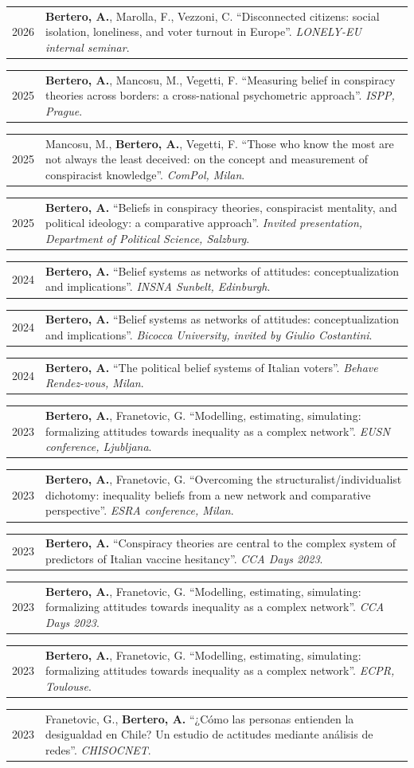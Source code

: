 \documentclass[10pt,a4paper]{article}
\makeatletter
\newlength{\yearw}\setlength{\yearw}{2.3cm}
\newlength{\bodyw}\setlength{\bodyw}{\dimexpr\textwidth-\yearw-0.45cm\relax}
\newcommand{\cv}[2]{%
  \needspace{2\baselineskip}%
  \par\noindent
  \begin{tabular}{@{}>{\raggedright\arraybackslash}p{\yearw}@{\hspace{0.45cm}}>{\raggedright\arraybackslash}p{\bodyw}@{}}
    \sanslabel\fontsize{8.5}{10.5}\selectfont\color{muted}#1 & #2
  \end{tabular}%
  \par\vspace{3pt}%
}
\newcommand{\venue}[1]{\textit{#1}}
\makeatother
\begin{document}
\cv{2026}{\textbf{Bertero, A.}, Marolla, F., Vezzoni, C. “Disconnected citizens: social isolation, loneliness, and voter turnout in Europe”. \venue{LONELY-EU internal seminar}.}

\cv{2025}{\textbf{Bertero, A.}, Mancosu, M., Vegetti, F. “Measuring belief in conspiracy theories across borders: a cross-national psychometric approach”. \venue{ISPP, Prague}.}

\cv{2025}{Mancosu, M., \textbf{Bertero, A.}, Vegetti, F. “Those who know the most are not always the least deceived: on the concept and measurement of conspiracist knowledge”. \venue{ComPol, Milan}.}

\cv{2025}{\textbf{Bertero, A.} “Beliefs in conspiracy theories, conspiracist mentality, and political ideology: a comparative approach”. \venue{Invited presentation, Department of Political Science, Salzburg}.}

\cv{2024}{\textbf{Bertero, A.} “Belief systems as networks of attitudes: conceptualization and implications”. \venue{INSNA Sunbelt, Edinburgh}.}

\cv{2024}{\textbf{Bertero, A.} “Belief systems as networks of attitudes: conceptualization and implications”. \venue{Bicocca University, invited by Giulio Costantini}.}

\cv{2024}{\textbf{Bertero, A.} “The political belief systems of Italian voters”. \venue{Behave Rendez-vous, Milan}.}

\cv{2023}{\textbf{Bertero, A.}, Franetovic, G. “Modelling, estimating, simulating: formalizing attitudes towards inequality as a complex network”. \venue{EUSN conference, Ljubljana}.}

\cv{2023}{\textbf{Bertero, A.}, Franetovic, G. “Overcoming the structuralist/individualist dichotomy: inequality beliefs from a new network and comparative perspective”. \venue{ESRA conference, Milan}.}

\cv{2023}{\textbf{Bertero, A.} “Conspiracy theories are central to the complex system of predictors of Italian vaccine hesitancy”. \venue{CCA Days 2023}.}

\cv{2023}{\textbf{Bertero, A.}, Franetovic, G. “Modelling, estimating, simulating: formalizing attitudes towards inequality as a complex network”. \venue{CCA Days 2023}.}

\cv{2023}{\textbf{Bertero, A.}, Franetovic, G. “Modelling, estimating, simulating: formalizing attitudes towards inequality as a complex network”. \venue{ECPR, Toulouse}.}

\cv{2023}{Franetovic, G., \textbf{Bertero, A.} “¿Cómo las personas entienden la desigualdad en Chile? Un estudio de actitudes mediante análisis de redes”. \venue{CHISOCNET}.}
\end{document}
